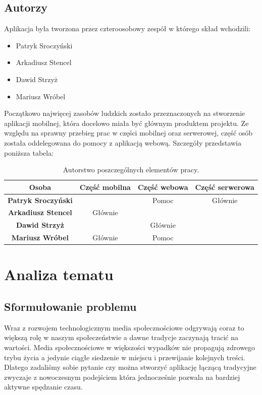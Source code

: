 \documentclass[a4paper,twoside,12pt]{book}
\begin{document}
\newpage

\section{Autorzy}
Aplikacja była tworzona przez czteroosobowy zespół w którego skład wchodzili: 
\begin{itemize}
    \item Patryk Sroczyński
    \item Arkadiusz Stencel
    \item Dawid Strzyż
    \item Mariusz Wróbel
\end{itemize}

Początkowo najwięcej zasobów ludzkich zostało przeznaczonych na stworzenie aplikacji mobilnej, która docelowo miała być głównym produktem projektu. Ze względu na sprawny przebieg prac w części mobilnej oraz serwerowej, część osób została oddelegowana do pomocy z aplikacją webową. Szczegóły przedstawia poniższa tabela:
\begin{table}[ht]
\centering
\begin{tabular}{|c|c|c|c|}
\hline
\textbf{Osoba} & \textbf{Część mobilna} & \textbf{Część webowa} & \textbf{Część serwerowa} \\ \hline
\textbf{Patryk Sroczyński}    &               & Pomoc            & Głównie      \\ \hline
\textbf{Arkadiusz Stencel}    & Głównie       &                  &              \\ \hline
\textbf{Dawid Strzyż}         &               & Głównie          &              \\ \hline
\textbf{Mariusz Wróbel}       & Głównie       & Pomoc            &              \\ \hline
\end{tabular}
\caption{Autorstwo poszczególnych elementów pracy.}
\end{table}


\chapter{Analiza tematu}

\section{Sformułowanie problemu}
Wraz z rozwojem technologicznym media społecznościowe odgrywają coraz to większą rolę w naszym społeczeństwie a dawne tradycje zaczynają tracić na wartości. Media społecznościowe w większości wypadków nie propagują zdrowego trybu życia a jedynie ciągłe siedzenie w miejscu i przewijanie kolejnych treści. Dlatego zadaliśmy sobie pytanie czy można stworzyć aplikację łączącą tradycyjne zwyczaje z nowoczesnym podejściem która jednocześnie pozwala na bardziej aktywne spędzanie czasu.
\end{document}
